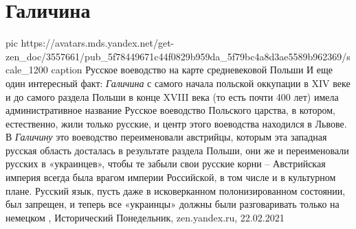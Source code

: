 
 
 
 
 
\chapter{Галичина}
\label{sec:slova.galichina}

\ifcmt
  pic https://avatars.mds.yandex.net/get-zen_doc/3557661/pub_5f78449671c44f0829b959da_5f79bc4a8d3ae5589b962369/scale_1200
	caption Русское воеводство на карте средневековой Польши
\fi
И еще один интересный факт: \emph{Галичина} с самого начала польской оккупации в XIV
веке и до самого раздела Польши в конце XVIII века (то есть почти 400 лет)
имела административное название Русское воеводство Польского царства, в
котором, естественно, жили только русские, и центр этого воеводства находился в
Львове. В \emph{Галичину} это воеводство переименовали австрийцы, которым эта западная
русская область досталась в результате раздела Польши, они же и переименовали
русских в «украинцев», чтобы те забыли свои русские корни – Австрийская империя
всегда была врагом империи Российской, в том числе и в культурном плане.
Русский язык, пусть даже в исковерканном полонизированном состоянии, был
запрещен, и теперь все «украинцы» должны были разговаривать только на немецком
, 
Исторический Понедельник, zen.yandex.ru, 22.02.2021 

